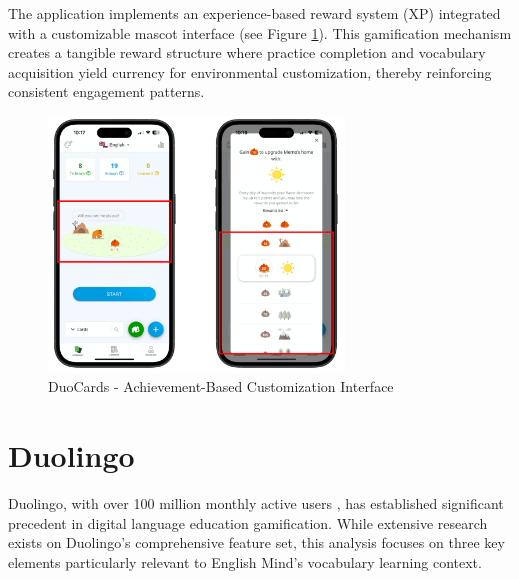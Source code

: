 \begin{itemize}
    The application implements an experience-based reward system (XP) integrated with a customizable mascot interface (see Figure \ref{fig:duocards-memo}). This gamification mechanism creates a tangible reward structure where practice completion and vocabulary acquisition yield currency for environmental customization, thereby reinforcing consistent engagement patterns.

    \begin{figure}[!h]
        \includegraphics[width=0.7\textwidth]{src/figures/duocards-memo.png}
        \caption{DuoCards - Achievement-Based Customization Interface}
        \label{fig:duocards-memo}
    \end{figure}

\end{itemize}

\section{Duolingo}

Duolingo, with over 100 million monthly active users \cite{cite:duolingo_2024q2}, has established significant precedent in digital language education gamification. While extensive research exists on Duolingo's comprehensive feature set, this analysis focuses on three key elements particularly relevant to English Mind's vocabulary learning context.

